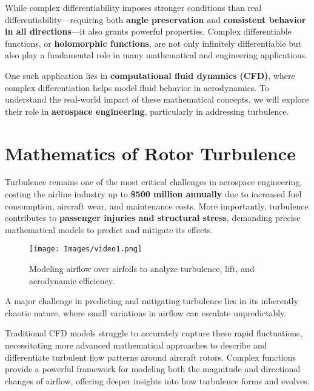 \documentclass[a4paper,10.5pt]{article}
\begin{document}
\vspace{0.5cm}

While complex differentiability imposes stronger conditions than real differentiability—requiring both \textbf{angle preservation} and \textbf{consistent behavior in all directions}—it also grants powerful properties. Complex differentiable functions, or \textbf{holomorphic functions}, are not only infinitely differentiable but also play a fundamental role in many mathematical and engineering applications.

\vspace{0.5cm}

One such application lies in \textbf{computational fluid dynamics (CFD)}, where complex differentiation helps model fluid behavior in aerodynamics. To understand the real-world impact of these mathematical concepts, we will explore their role in \textbf{aerospace engineering}, particularly in addressing turbulence.


\section{Mathematics of Rotor Turbulence}

Turbulence remains one of the most critical challenges in aerospace engineering, costing the airline industry up to \textbf{\$500 million annually} due to increased fuel consumption, aircraft wear, and maintenance costs. More importantly, turbulence contributes to \textbf{passenger injuries and structural stress}, demanding precise mathematical models to predict and mitigate its effects.

\begin{figure}[H]
    \centering
    \texttt{[image: Images/video1.png]}
    \caption{Modeling airflow over airfoils to analyze turbulence, lift, and aerodynamic efficiency.}
    \label{fig:galaxy}
\end{figure}

A major challenge in predicting and mitigating turbulence lies in its inherently chaotic nature, where small variations in airflow can escalate unpredictably.

Traditional CFD models struggle to accurately capture these rapid fluctuations, necessitating more advanced mathematical approaches to describe and differentiate turbulent flow patterns around aircraft rotors. Complex functions provide a powerful framework for modeling both the magnitude and directional changes of airflow, offering deeper insights into how turbulence forms and evolves.
\end{document}
